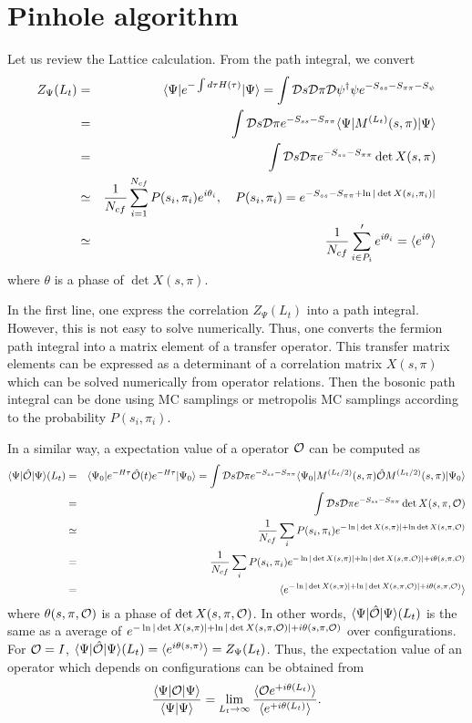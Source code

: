 \documentclass[10pt]{book}
\newcommand{\bea}{\begin{eqnarray}}
\newcommand{\eea}{\end{eqnarray}}
\newcommand{\no}{\nonumber \\}
\def\la{\langle}
\def\ra{\rangle}
\begin{document}
\section{Pinhole algorithm}
Let us review the Lattice calculation. 
From the path integral, we convert
\bea
Z_\Psi(L_t)&=&\la \Psi| e^{-\int d\tau H(\tau)} |\Psi\ra 
            =\int {\cal D}s{\cal D}\pi {\cal D}\psi^\dagger \psi e^{-S_{ss}-S_{\pi\pi}-S_{\psi}}   \no 
           &=&  \int {\cal D}s{\cal D}\pi e^{-S_{ss}-S_{\pi\pi} }\la\Psi | M^{(L_t)}(s,\pi)|\Psi\ra \no 
           &=&  \int {\cal D}s{\cal D}\pi e^{-S_{ss}-S_{\pi\pi}}\det X(s,\pi)  \no 
           &\simeq& \frac{1}{N_{cf}}\sum_{i=1}^{N_{cf}} P(s_i,\pi_i) e^{i\theta_i} ,\quad 
                   P(s_i,\pi_i)= e^{-S_{ss}-S_{\pi\pi}+\ln|\det X(s_i,\pi_i)|}
           \no 
           &\simeq&  \frac{1}{N_{cf}}\sum'_{i\in P_i} e^{i\theta_i} =\la e^{i\theta}\ra 
\eea 
where $\theta$ is a phase of $\det X(s,\pi)$.

In the first line, one express the correlation $Z_\Psi(L_t)$ into a path integral. 
However, this is not easy to solve numerically. Thus, one converts the fermion path integral into a
matrix element of a transfer operator. This transfer matrix elements can be expressed as a
determinant of a correlation matrix $X(s,\pi)$ which can be solved numerically from 
operator relations. Then the bosonic path integral can be done using MC samplings 
or metropolis MC samplings according to the probability $P(s_i,\pi_i)$. 

In a similar way, a expectation value of a operator ${\cal O}$ can be computed as
\bea 
\la \Psi|\hat{\cal O}|\Psi\ra(L_t) 
&=& \la \Psi_0| e^{-H\tau}  \hat{\cal O}(t) e^{-H\tau}   |\Psi_0\ra
=\int {\cal D}s{\cal D}\pi e^{-S_{ss}-S_{\pi\pi}} 
     \la \Psi_0| M^{(L_t/2)}(s,\pi) \hat{\cal O} M^{(L_t/2)}(s,\pi)|\Psi_0\ra  \no 
&=& \int {\cal D}s{\cal D}\pi e^{-S_{ss}-S_{\pi\pi}}  \det X(s,\pi,{\cal O}) \no  
&\simeq & \frac{1}{N_{cf}}\sum_i  P(s_i,\pi_i) e^{-\ln|\det X(s,\pi)|+\ln\det X(s,\pi,{\cal O})}  \no 
&=&  \frac{1}{N_{cf}}\sum_i  P(s_i,\pi_i) e^{-\ln|\det X(s,\pi)|+\ln|\det X(s,\pi,{\cal O})|+i\theta(s,\pi,{\cal O}) }  \no 
&=&   \la   e^{-\ln|\det X(s,\pi)|+\ln|\det X(s,\pi,{\cal O})|+i\theta(s,\pi,{\cal O}) } \ra 
\eea 
where $\theta(s,\pi,{\cal O})$ is a phase of $\det X(s,\pi,{\cal O})$. In other words,
$\la \Psi|\hat{\cal O}|\Psi\ra(L_t) $ is the same as a average 
of $e^{-\ln|\det X(s,\pi)|+\ln|\det X(s,\pi,{\cal O})|+i\theta(s,\pi,{\cal O}) }$
over configurations. For ${\cal O}=I$, $\la \Psi|\hat{\cal O}|\Psi\ra(L_t)=\la e^{i\theta(s,\pi)}\ra= Z_\Psi(L_t)$. 
Thus, the expectation value of an operator which depends on configurations can be obtained from
\bea 
\frac{\la \Psi|{\cal O}|\Psi\ra }{\la \Psi|\Psi\ra }
=\lim_{L_t\to \infty} \frac{\la {\cal O} e^{+i\theta(L_t) } \ra }{\la e^{+i\theta(L_t) } \ra   }. 
\eea 
\end{document}
